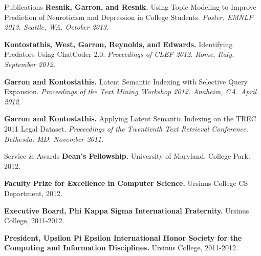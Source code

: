 \documentclass{resume} %
\begin{document}

\begin{rSection}{Publications}
\textbf{Resnik, Garron, and Resnik.} Using Topic Modeling to Improve Prediction of Neuroticism and Depression in College Students. \textit{Poster, EMNLP 2013. Seattle, WA. October 2013.}
\item \textbf{Kontostathis, West, Garron, Reynolds, and Edwards.} Identifying Predators Using ChatCoder 2.0. \textit{Proceedings of CLEF 2012. Rome, Italy. September 2012.}
\item \textbf{Garron and Kontostathis.} Latent Semantic Indexing with Selective Query Expansion. \textit{Proceedings of the Text Mining Workshop 2012. Anaheim, CA. April 2012.}
\item \textbf{Garron and Kontostathis.} Applying Latent Semantic Indexing on the TREC 2011 Legal Dataset. \textit{Proceedings of the Twentienth Text Retrieval Conference. Bethesda, MD. November 2011.}
\end{rSection}

\begin{rSection}{Service \& Awards}
\textbf{Dean's Fellowship.} University of Maryland, College Park. 2012.
\item \textbf{Faculty Prize for Excellence in Computer Science.} Ursinus College CS Department, 2012.
\item \textbf{Executive Board, Phi Kappa Sigma International Fraternity.} Ursinus College, 2011-2012.
\item \textbf{President, Upsilon Pi Epsilon International Honor Society for the Computing and Information Disciplines.} Ursinus College, 2011-2012.
\end{rSection}
\end{document}
